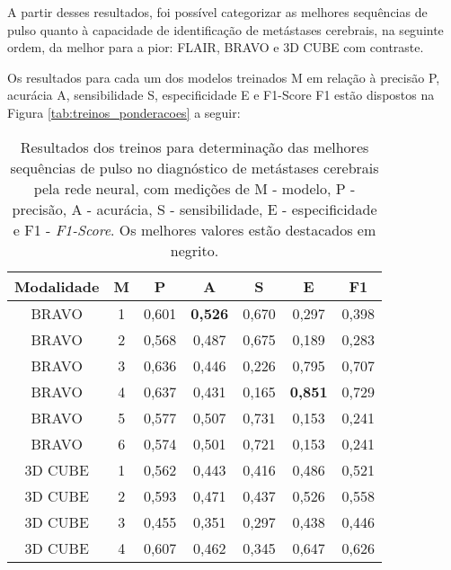 A partir desses resultados, foi possível categorizar as melhores sequências de pulso quanto à capacidade de identificação de metástases cerebrais, na seguinte ordem, da melhor para a pior: FLAIR, BRAVO e 3D CUBE com contraste. 

Os resultados para cada um dos modelos treinados M em relação à precisão P, acurácia A, sensibilidade S, especificidade E e F1-Score F1 estão dispostos na Figura \ref{tab:treinos_ponderacoes} a seguir:

\begin{table}[!htb]
\centering
\caption{Resultados dos treinos para determinação das melhores sequências de pulso no diagnóstico de metástases cerebrais pela rede neural, com medições de M - modelo, P - precisão, A - acurácia, S - sensibilidade, E - especificidade e F1 - \textit{F1-Score}. Os melhores valores estão destacados em negrito.}
\begin{tabular}{ccccccc}
\hline
\textbf{Modalidade}       & \textbf{M} & \textbf{P}              & \textbf{A}              & \textbf{S}              & \textbf{E}              & \textbf{F1}             \\ \hline
BRAVO      & 1 & 0,601          & \textbf{0,526} & 0,670          & 0,297          & 0,398          \\
BRAVO      & 2 & 0,568          & 0,487          & 0,675          & 0,189          & 0,283          \\
BRAVO      & 3 & 0,636          & 0,446          & 0,226          & 0,795          & 0,707          \\
BRAVO      & 4 & 0,637          & 0,431          & 0,165          & \textbf{0,851} & 0,729          \\
BRAVO      & 5 & 0,577          & 0,507          & 0,731          & 0,153          & 0,241          \\
BRAVO      & 6 & 0,574          & 0,501          & 0,721          & 0,153          & 0,241          \\
3D CUBE    & 1 & 0,562          & 0,443          & 0,416          & 0,486          & 0,521          \\
3D CUBE    & 2 & 0,593          & 0,471          & 0,437          & 0,526          & 0,558          \\
3D CUBE    & 3 & 0,455          & 0,351          & 0,297          & 0,438          & 0,446          \\
3D CUBE    & 4 & 0,607          & 0,462          & 0,345          & 0,647          & 0,626          \\

\end{tabular}
\end{table}
